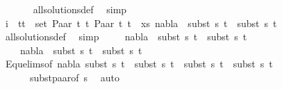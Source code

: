 \begin{isabellebody}
\ \ \ \ \ \isamarkupfalse%
\ all{\isacharunderscore}{\kern0pt}solutions{\isacharunderscore}{\kern0pt}def\ \isamarkupfalse%
\ simp\isanewline
\isanewline
\ \ \ \isamarkupfalse%
\ {}\isanewline
\ \ \ \isamarkupfalse%
\ i{\isacharcolon}{\kern0pt}\ {\isachardoublequoteopen}{\isasymforall}\ {\isacharparenleft}{\kern0pt}t{}{\isacharcomma}{\kern0pt}t{}{\isacharparenright}{\kern0pt}\ {\isasymin}\ set\ {\isacharparenleft}{\kern0pt}{\isacharparenleft}{\kern0pt}Paar\ t{}\ t{}{\isacharcomma}{\kern0pt}\ Paar\ t{}\ t{}{\isacharparenright}{\kern0pt}\ {\isacharhash}{\kern0pt}\ xs{\isacharparenright}{\kern0pt}{\isachardot}{\kern0pt}\ nabla{}\ {\isasymturnstile}\ subst\ s{}\ t{}\ {\isasymapprox}\ subst\ s{}\ t{}{\isachardoublequoteclose}\isanewline
\ \ \ \ \ \isamarkupfalse%
\ all{\isacharunderscore}{\kern0pt}solutions{\isacharunderscore}{\kern0pt}def\ \isamarkupfalse%
\ simp\isanewline
\ \ \ \isamarkupfalse%
\ {\isachardoublequoteopen}nabla{}\ {\isasymturnstile}\ subst\ s{}\ t{}\ {\isasymapprox}\ subst\ s{}\ t{}{\isachardoublequoteclose}\ \isanewline
\ \ \ \ {\isachardoublequoteopen}nabla{}\ {\isasymturnstile}\ subst\ s{}\ t{}\ {\isasymapprox}\ subst\ s{}\ t{}{\isachardoublequoteclose}\isanewline
\ \ \ \ \isamarkupfalse%
\ Equ{\isacharunderscore}{\kern0pt}elims{\isacharparenleft}{\kern0pt}{}{\isacharparenright}{\kern0pt}{\isacharbrackleft}{\kern0pt}of\ nabla{}\ {\isacartoucheopen}{\isacharparenleft}{\kern0pt}subst\ s{}\ t{}{\isacharparenright}{\kern0pt}{\isacartoucheclose}\ \ {\isacartoucheopen}{\isacharparenleft}{\kern0pt}subst\ s{}\ t{}{\isacharparenright}{\kern0pt}{\isacartoucheclose}\ \ {\isacartoucheopen}{\isacharparenleft}{\kern0pt}subst\ s{}\ t{}{\isacharparenright}{\kern0pt}{\isacartoucheclose}\ \ {\isacartoucheopen}{\isacharparenleft}{\kern0pt}subst\ s{}\ t{}{\isacharparenright}{\kern0pt}{\isacartoucheclose}{\isacharbrackright}{\kern0pt}\ \isanewline
\ \ \ \ \ \ subst{\isacharunderscore}{\kern0pt}paar{\isacharbrackleft}{\kern0pt}of\ s{}{\isacharbrackright}{\kern0pt}\ \isamarkupfalse%
\ auto{\isacharplus}{\kern0pt}\isanewline

\end{isabellebody}
